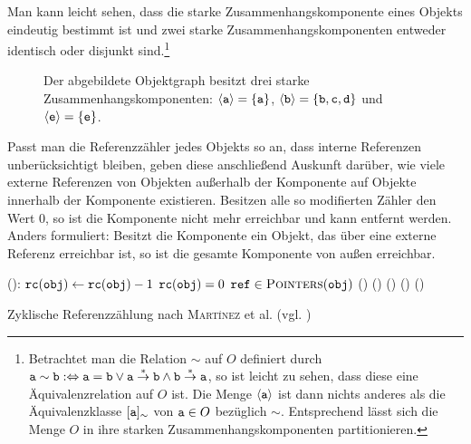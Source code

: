 Man kann leicht sehen, dass die starke Zusammenhangskomponente eines Objekts eindeutig bestimmt ist und zwei starke Zusammenhangskomponenten entweder identisch oder disjunkt sind.\footnote{Betrachtet man die Relation $\sim$ auf $O$ definiert durch $\texttt{a} \sim \texttt{b} :\Leftrightarrow \texttt{a} = \texttt{b} \vee \texttt{a} \overset{*}{\rightarrow} \texttt{b} \wedge \texttt{b} \overset{*}{\rightarrow} \texttt{a}$, so ist leicht zu sehen, dass diese eine Äquivalenzrelation auf $O$ ist. Die Menge $\left\langle\texttt{a}\right\rangle$ ist dann nichts anderes als die Äquivalenzklasse $[\texttt{a}]_{\sim}$ von $\texttt{a} \in O$ bezüglich $\sim$. Entsprechend lässt sich die Menge $O$ in ihre starken Zusammenhangskomponenten partitionieren.}

\begin{figure}[h]
	\centering
	
	\caption[Beispiel für starke Zusammenhangskomponenten]{Der abgebildete Objektgraph besitzt drei starke Zusammenhangskomponenten: $\left\langle\texttt{a}\right\rangle = \{\texttt{a}\}$, $\left\langle\texttt{b}\right\rangle = \{\texttt{b}, \texttt{c}, \texttt{d}\}$ und $\left\langle\texttt{e}\right\rangle = \{\texttt{e}\}$.}
	\label{fig:rc-scc}
\end{figure}

Passt man die Referenzzähler jedes Objekts so an, dass interne Referenzen unberücksichtigt bleiben, geben diese anschließend Auskunft darüber, wie viele externe Referenzen von Objekten außerhalb der Komponente auf Objekte innerhalb der Komponente existieren.
Besitzen alle so modifierten Zähler den Wert $0$, so ist die Komponente nicht mehr erreichbar und kann entfernt werden.
Anders formuliert: Besitzt die Komponente ein Objekt, das über eine externe Referenz erreichbar ist, so ist die gesamte Komponente von außen erreichbar.

\begin{algorithm}[h]
\begin{algorithmic}[1]
	\State {}():
	\State \quad $\texttt{rc}(\texttt{obj}) \gets \texttt{rc}(\texttt{obj}) - 1$
	\State \quad \IF $\texttt{rc}(\texttt{obj}) = 0$
	\State \quad \quad \FOREACH $\texttt{ref} \in \textsc{Pointers}(\texttt{obj})$
	\State \quad \quad \quad {}()
	\State \quad \quad {}()
	\State \quad \ELSE
	\State \quad \quad {}()		
	\State \quad \quad {}()		
	\State \quad \quad {}()	
\end{algorithmic}
\caption[Zyklische Referenzzählung]{Zyklische Referenzzählung nach \textsc{Martínez} et al. (vgl. \cite[S. 32]{martinez1990})}
\label{algo:cyclic-rc}
\end{algorithm}

